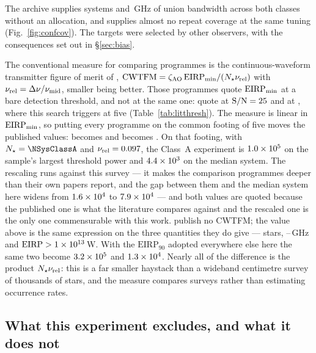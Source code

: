 The archive supplies \NSystems{} systems and \UnionGHz\,GHz of union
bandwidth across both classes without an allocation, and supplies almost no
repeat coverage at the same tuning (Fig.~\ref{fig:confcov}). The targets were
selected by other observers, with the consequences set out in
\S\ref{sec:bias}.

The conventional measure for comparing programmes is the continuous-waveform
transmitter figure of merit of \citet{Enriquez2017},
$\mathrm{CWTFM}=\zeta_{\rm AO}\,\mathrm{EIRP}_{\rm min}/
(N_{\star}\nu_{\rm rel})$ with $\nu_{\rm rel}=\Delta\nu/\nu_{\rm mid}$,
smaller being better. Those programmes quote $\mathrm{EIRP}_{\rm min}$ at a
bare detection threshold, and not at the same one: \citet{Enriquez2017} quote
at $\mathrm{S/N}=25$ and \citet{Margot2023} at
\FomLitSnrMargot, where this search triggers at five
(Table~\ref{tab:litthresh}). The measure is linear in
$\mathrm{EIRP}_{\rm min}$, so putting every programme on the common footing
of five moves the published values: \FomLitEnriquez{} becomes
\FomLitEnriquezFive{} and \FomLitMargot{} becomes \FomLitMargotFive. On that
footing, with $N_{\star}=\NSysClassA$ and $\nu_{\rm rel}=0.097$, the
Class~A experiment is $1.0\times10^{5}$ on the sample's largest threshold
power and $4.4\times10^{3}$ on the median system. The rescaling runs against
this survey --- it makes the comparison programmes deeper than their own
papers report, and the gap between them and the median system here widens
from $1.6\times10^{4}$ to $7.9\times10^{4}$ --- and both values are
quoted because the published one is what the literature compares against and
the rescaled one is the only one commensurable with this work.
\citet{Margot2023} publish no
CWTFM; the value above is the same expression on the three quantities they do
give --- \FomMargotN{} stars, \FomMargotLo--\FomMargotHi\,GHz and
$\mathrm{EIRP}>1\times10^{13}$\,W.
With the $\mathrm{EIRP}_{90}$ adopted
everywhere else here the same two become $3.2\times10^{5}$ and
$1.3\times10^{4}$. Nearly all of
the difference is the product $N_{\star}\nu_{\rm rel}$: this is a far smaller
haystack than a wideband centimetre survey of thousands of stars, and the
measure compares surveys rather than estimating occurrence rates.

\subsection{What this experiment excludes, and what it does not}
\label{sec:excludes}

